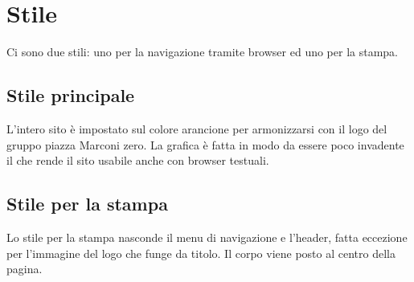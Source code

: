\documentclass[a4paper,10pt]{article}
\begin{document}
\section{Stile}

Ci sono due stili: uno per la navigazione tramite browser ed uno per la stampa.

\subsection{Stile principale}
L'intero sito \`e impostato sul colore arancione per armonizzarsi con il logo del gruppo piazza Marconi zero. La grafica \`e fatta in modo da essere poco invadente il che rende il sito usabile anche con browser testuali.

\subsection{Stile per la stampa}
Lo stile per la stampa nasconde il menu di navigazione e l'header, fatta eccezione per l'immagine del logo che funge da titolo. Il corpo viene posto al centro della pagina.
\end{document}
